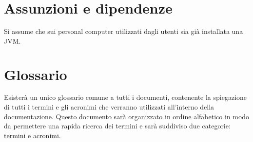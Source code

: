 \section{Assunzioni e dipendenze}
Si assume che sui personal computer utilizzati dagli utenti sia gi\`a installata
una JVM.
\section{Glossario}
Esister\`a un unico glossario comune a tutti i documenti, contenente la
spiegazione di tutti i termini e gli acronimi che verranno utilizzati
all'interno della documentazione. Questo documento sar\`a organizzato in ordine
alfabetico in modo da permettere una rapida ricerca dei termini e sar\`a suddiviso
due categorie: termini e acronimi.

